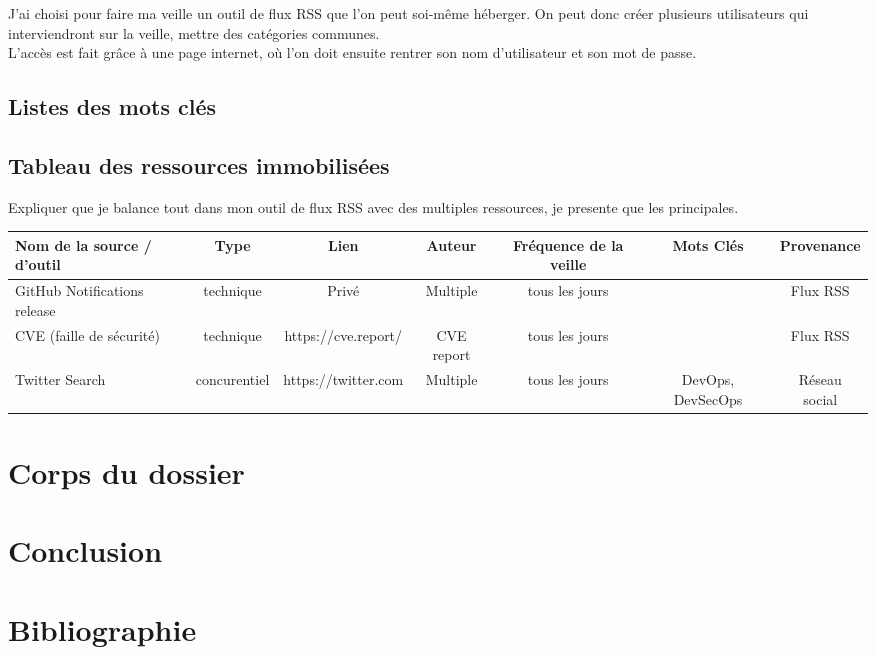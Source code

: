 \documentclass[11pt,a4paper,oneside]{book}
\begin{document}
J'ai choisi pour faire ma veille un outil de flux RSS que l'on peut soi-même héberger.
On peut donc créer plusieurs utilisateurs qui interviendront sur la veille, mettre des catégories communes. \\
L'accès est fait grâce à une page internet, où l'on doit ensuite rentrer son nom d'utilisateur et son mot de passe.

\section{Listes des mots clés}

\newpage

\begin{landscape}

\section{Tableau des ressources immobilisées}

Expliquer que je balance tout dans mon outil de flux RSS avec des multiples ressources, je presente que les principales.

\begin{tabular}{|l|c|c|c|c|c|c|}
\hline
\rowcolor{gray!30} Nom de la source / d'outil & Type & Lien & Auteur & Fréquence de la veille & Mots Clés & Provenance \\
\hline
GitHub Notifications release & technique & Privé & Multiple & tous les jours & & Flux RSS \\
CVE (faille de sécurité) & technique & https://cve.report/ & CVE report & tous les jours & & Flux RSS \\
Twitter Search & concurentiel & https://twitter.com & Multiple & tous les jours & DevOps, DevSecOps & Réseau social \\
\hline
\end{tabular}

\end{landscape}

\chapter{Corps du dossier}

\chapter{Conclusion}


\chapter{Bibliographie}
\end{document}
